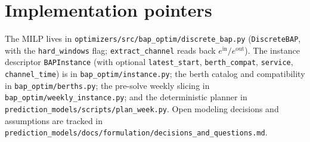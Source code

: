 \documentclass[11pt]{article}
\begin{document}
\section{Implementation pointers}
The MILP lives in \texttt{optimizers/src/bap\_optim/discrete\_bap.py}
(\texttt{DiscreteBAP}, with the \texttt{hard\_windows} flag; \texttt{extract\_channel}
reads back $e^{\mathrm{in}}/e^{\mathrm{out}}$). The instance
descriptor \texttt{BAPInstance} (with optional \texttt{latest\_start},
\texttt{berth\_compat}, \texttt{service}, \texttt{channel\_time}) is in \texttt{bap\_optim/instance.py}; the
berth catalog and compatibility in \texttt{bap\_optim/berths.py}; the pre-solve
weekly slicing in \texttt{bap\_optim/weekly\_instance.py}; and the deterministic
planner in \texttt{prediction\_models/scripts/plan\_week.py}. Open modeling decisions
and assumptions are tracked in \texttt{prediction\_models/docs/formulation/decisions\_and\_questions.md}.



\end{document}

